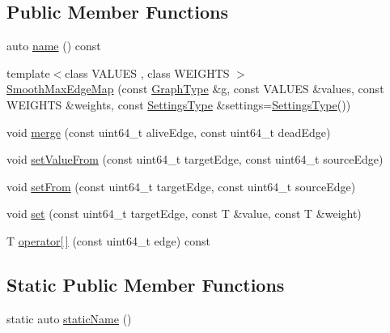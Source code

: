 \subsection*{Public Member Functions}
\begin{DoxyCompactItemize}
\item 
auto \hyperlink{classnifty_1_1graph_1_1agglo_1_1merge__rules_1_1SmoothMaxEdgeMap_a287e909e5f1222784b2213960ade1658}{name} () const
\item 
{\footnotesize template$<$class V\+A\+L\+U\+ES , class W\+E\+I\+G\+H\+TS $>$ }\\\hyperlink{classnifty_1_1graph_1_1agglo_1_1merge__rules_1_1SmoothMaxEdgeMap_a4aa821c3b693ed4eb550d4d0b4579e1f}{Smooth\+Max\+Edge\+Map} (const \hyperlink{classnifty_1_1graph_1_1agglo_1_1merge__rules_1_1SmoothMaxEdgeMap_a30c83f3e3f699c7060a9e9605672246b}{Graph\+Type} \&g, const V\+A\+L\+U\+ES \&values, const W\+E\+I\+G\+H\+TS \&weights, const \hyperlink{classnifty_1_1graph_1_1agglo_1_1merge__rules_1_1SmoothMaxEdgeMap_a0f463ebc561d6770fa59b4168e4acf98}{Settings\+Type} \&settings=\hyperlink{classnifty_1_1graph_1_1agglo_1_1merge__rules_1_1SmoothMaxEdgeMap_a0f463ebc561d6770fa59b4168e4acf98}{Settings\+Type}())
\item 
void \hyperlink{classnifty_1_1graph_1_1agglo_1_1merge__rules_1_1SmoothMaxEdgeMap_a45a0264cbcf21f248437444510b7cb6c}{merge} (const uint64\+\_\+t alive\+Edge, const uint64\+\_\+t dead\+Edge)
\item 
void \hyperlink{classnifty_1_1graph_1_1agglo_1_1merge__rules_1_1SmoothMaxEdgeMap_a8ac7346a7f10f3267fdc6a57be483390}{set\+Value\+From} (const uint64\+\_\+t target\+Edge, const uint64\+\_\+t source\+Edge)
\item 
void \hyperlink{classnifty_1_1graph_1_1agglo_1_1merge__rules_1_1SmoothMaxEdgeMap_a64c165ba49ca6b304ecfe56d4a17bb7b}{set\+From} (const uint64\+\_\+t target\+Edge, const uint64\+\_\+t source\+Edge)
\item 
void \hyperlink{classnifty_1_1graph_1_1agglo_1_1merge__rules_1_1SmoothMaxEdgeMap_a01a6c6d85c9ebad17f45a37ada88d2f8}{set} (const uint64\+\_\+t target\+Edge, const T \&value, const T \&weight)
\item 
T \hyperlink{classnifty_1_1graph_1_1agglo_1_1merge__rules_1_1SmoothMaxEdgeMap_af895880f98eacaf3c8c157d730c256f7}{operator\mbox{[}$\,$\mbox{]}} (const uint64\+\_\+t edge) const
\end{DoxyCompactItemize}
\subsection*{Static Public Member Functions}
\begin{DoxyCompactItemize}
\item 
static auto \hyperlink{classnifty_1_1graph_1_1agglo_1_1merge__rules_1_1SmoothMaxEdgeMap_a7757ee60e33b74e2ecb85c3c5324a3a5}{static\+Name} ()
\end{DoxyCompactItemize}


